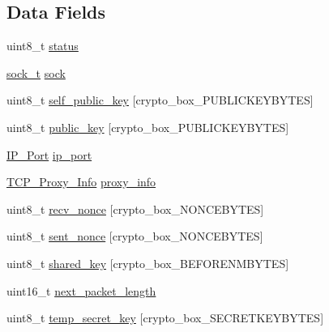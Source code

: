 \subsection*{Data Fields}
\begin{DoxyCompactItemize}
\item 
uint8\+\_\+t \hyperlink{struct_t_c_p___client___connection_ade818037fd6c985038ff29656089758d}{status}
\item 
\hyperlink{network_8h_ae5faf8a8d23da59c3e3025a62039d8c1}{sock\+\_\+t} \hyperlink{struct_t_c_p___client___connection_a35b19d84fb632ca8ce5cab237f7089a5}{sock}
\item 
uint8\+\_\+t \hyperlink{struct_t_c_p___client___connection_ae726df8bdc26380e5a6c3187a00d6881}{self\+\_\+public\+\_\+key} \mbox{[}crypto\+\_\+box\+\_\+\+P\+U\+B\+L\+I\+C\+K\+E\+Y\+B\+Y\+T\+E\+S\mbox{]}
\item 
uint8\+\_\+t \hyperlink{struct_t_c_p___client___connection_aaa806bb1136fb3d4b5d8d8970b596ff7}{public\+\_\+key} \mbox{[}crypto\+\_\+box\+\_\+\+P\+U\+B\+L\+I\+C\+K\+E\+Y\+B\+Y\+T\+E\+S\mbox{]}
\item 
\hyperlink{struct_i_p___port}{I\+P\+\_\+\+Port} \hyperlink{struct_t_c_p___client___connection_a86e2a5a56c0dd22df6e8b8a10e40f9e4}{ip\+\_\+port}
\item 
\hyperlink{struct_t_c_p___proxy___info}{T\+C\+P\+\_\+\+Proxy\+\_\+\+Info} \hyperlink{struct_t_c_p___client___connection_aa737023350cf47e63993e3b4dc9a7472}{proxy\+\_\+info}
\item 
uint8\+\_\+t \hyperlink{struct_t_c_p___client___connection_aae0467706f97aa3ef23e5dc9c3c199d7}{recv\+\_\+nonce} \mbox{[}crypto\+\_\+box\+\_\+\+N\+O\+N\+C\+E\+B\+Y\+T\+E\+S\mbox{]}
\item 
uint8\+\_\+t \hyperlink{struct_t_c_p___client___connection_a9df0e00e8f493ed6cd1ff45e7da33c0d}{sent\+\_\+nonce} \mbox{[}crypto\+\_\+box\+\_\+\+N\+O\+N\+C\+E\+B\+Y\+T\+E\+S\mbox{]}
\item 
uint8\+\_\+t \hyperlink{struct_t_c_p___client___connection_a81ead9fac55a0cedc30a96253a2c5119}{shared\+\_\+key} \mbox{[}crypto\+\_\+box\+\_\+\+B\+E\+F\+O\+R\+E\+N\+M\+B\+Y\+T\+E\+S\mbox{]}
\item 
uint16\+\_\+t \hyperlink{struct_t_c_p___client___connection_a1d1e3047af3c935db36ae7b2360aaec7}{next\+\_\+packet\+\_\+length}
\item 
uint8\+\_\+t \hyperlink{struct_t_c_p___client___connection_a6de303feb7b7892cc6a38228554b3e78}{temp\+\_\+secret\+\_\+key} \mbox{[}crypto\+\_\+box\+\_\+\+S\+E\+C\+R\+E\+T\+K\+E\+Y\+B\+Y\+T\+E\+S\mbox{]}

\end{DoxyCompactItemize}

